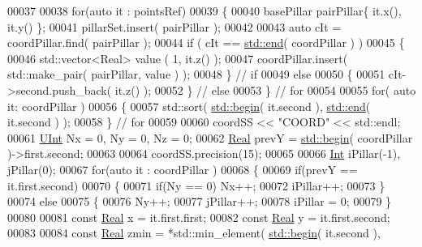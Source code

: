 \begin{DoxyCode}
00037 
00038     \textcolor{keywordflow}{for}(\textcolor{keyword}{auto} it : pointsRef)
00039     \{
00040         basePillar pairPillar\{ it.x(), it.y() \};
00041         pillarSet.insert( pairPillar );
00042 
00043         \textcolor{keyword}{auto} cIt = coordPillar.find( pairPillar );
00044         \textcolor{keywordflow}{if} ( cIt == \hyperlink{namespacestd_aeb4b319cf9afda99ba1f47d32df15bc9}{std::end}( coordPillar ) )
00045         \{
00046             std::vector<Real> value ( 1, it.z() );
00047             coordPillar.insert( std::make\_pair( pairPillar, value ) );
00048         \} \textcolor{comment}{// if}
00049         \textcolor{keywordflow}{else}
00050         \{
00051             cIt->second.push\_back( it.z() );
00052         \} \textcolor{comment}{// else}
00053     \} \textcolor{comment}{// for}
00054 
00055     \textcolor{keywordflow}{for}( \textcolor{keyword}{auto} it: coordPillar )
00056     \{
00057         std::sort( \hyperlink{namespacestd_acec9a198880c12f51f02be95a298a48b}{std::begin}( it.second ), \hyperlink{namespacestd_aeb4b319cf9afda99ba1f47d32df15bc9}{std::end}( it.second ) );
00058     \} \textcolor{comment}{// for}
00059 
00060     coordSS << \textcolor{stringliteral}{"COORD"} << std::endl;
00061     \hyperlink{namespaceFVCode3D_a4bf7e328c75d0fd504050d040ebe9eda}{UInt} Nx = 0, Ny = 0, Nz = 0;
00062     \hyperlink{namespaceFVCode3D_a40c1f5588a248569d80aa5f867080e83}{Real} prevY = \hyperlink{namespacestd_acec9a198880c12f51f02be95a298a48b}{std::begin}( coordPillar )->first.second;
00063 
00064     coordSS.precision(15);
00065 
00066     \hyperlink{namespaceFVCode3D_a2263c42382b217732a2d4e1f7348120a}{Int} iPillar(-1), jPillar(0);
00067     \textcolor{keywordflow}{for}(\textcolor{keyword}{auto} it : coordPillar )
00068     \{
00069         \textcolor{keywordflow}{if}(prevY == it.first.second)
00070         \{
00071             \textcolor{keywordflow}{if}(Ny == 0) Nx++;
00072             iPillar++;
00073         \}
00074         \textcolor{keywordflow}{else}
00075         \{
00076             Ny++;
00077             jPillar++;
00078             iPillar = 0;
00079         \}
00080 
00081         \textcolor{keyword}{const} \hyperlink{namespaceFVCode3D_a40c1f5588a248569d80aa5f867080e83}{Real} x = it.first.first;
00082         \textcolor{keyword}{const} \hyperlink{namespaceFVCode3D_a40c1f5588a248569d80aa5f867080e83}{Real} y = it.first.second;
00083 
00084         \textcolor{keyword}{const} \hyperlink{namespaceFVCode3D_a40c1f5588a248569d80aa5f867080e83}{Real} zmin = *std::min\_element( \hyperlink{namespacestd_acec9a198880c12f51f02be95a298a48b}{std::begin}( it.second ),

\end{DoxyCode}
